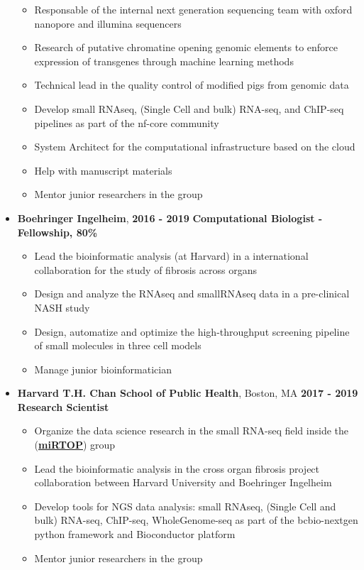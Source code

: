 \begin{itemize}
\begin{itemize}
\item
  Responsable of the internal next generation sequencing team with oxford nanopore and illumina sequencers
\item
  Research of putative chromatine opening genomic elements to enforce expression of transgenes through machine learning methods
\item
  Technical lead in the quality control of modified pigs from genomic data
\item 
  Develop small RNAseq, (Single Cell and bulk) RNA-seq, and ChIP-seq pipelines
  as part of the nf-core community
\item 
  System Architect for the computational infrastructure based on the cloud
\item
  Help with manuscript materials
\item Mentor junior researchers in the group
 \end{itemize}

\item
  \textbf{Boehringer Ingelheim}, \hfill \textbf{2016 - 2019}
  \newline
  \textbf{Computational Biologist - Fellowship, 80\%}
 \begin{itemize}
  \item  Lead the bioinformatic analysis (at Harvard) in a international collaboration for the study of fibrosis across organs 
  \item Design and analyze the RNAseq and smallRNAseq data in a pre-clinical NASH study
  \item Design, automatize and optimize the high-throughput screening pipeline of small molecules in three cell models
  \item Manage junior bioinformatician
\end{itemize}

\item
  \textbf{Harvard T.H. Chan School of Public Health}, Boston, MA \hfill \textbf{2017 - 2019}
  \newline
  \textbf{Research Scientist}
 \begin{itemize}
  \item
    Organize the data science research in the small RNA-seq field inside the  (\href{https://mirtop.github.com}{\textbf{miRTOP}}) group
  \item
    Lead the bioinformatic analysis in the cross organ fibrosis project
    collaboration between Harvard University and Boehringer Ingelheim
  \item
    Develop tools for NGS data analysis: small RNAseq, (Single
    Cell and bulk) RNA-seq, ChIP-seq, WholeGenome-seq as part of the bcbio-nextgen
    python framework and Bioconductor platform
  \item Mentor junior researchers in the group
\end{itemize}


\end{itemize}
